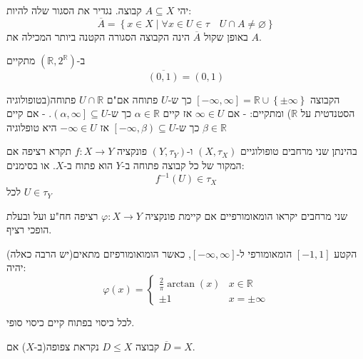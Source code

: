 \documentclass{tstextbook}
\begin{document}
\begin{definition}
יהי \(A\subseteq X\) קבוצה. נגדיר את הסגור שלה להיות:
$$\overline{A} = \left\{   x \in X \mid \forall x \in U \in \tau \quad U \cap A \neq \varnothing  \right\}$$
באופן שקול \(\overline{A}\) הינה הקבוצה הסגורה הקטנה ביותר המכילה את \(A\).

\end{definition}
\begin{example}
ב-\(\left( \mathbb{R}, 2^{\mathbb{R}} \right)\) מתקיים
$$\overline{(0,1)} = (0,1)$$

\end{example}
\begin{example}
הקבוצה \(\left[ -\infty,\infty \right]=\mathbb{R}\cup \left\{  \pm \infty  \right\}\) כך ש-\(U\) פתוחה אם"ם \(U\cap \mathbb{R}\) פתוחה(בטופולוגיה הסטנדטית על \(\mathbb{R}\)) ומתקיים:
- אם \(\infty \in U\) אז קיים \(\alpha \in \mathbb{R}\) כך ש-\(\left( \alpha,\infty \right]\subseteq U\). 
- אם קיים \(\beta \in \mathbb{R}\) כך ש-\(\left[ -\infty,\beta \right)\subseteq U\) אז \(-\infty \in U\)
היא טופלוגיה

\end{example}
\begin{definition}[רציפות]
בהינתן שני מרחבים טופולוגיים \(\left( X,\tau_{X} \right)\) ו-\(\left( Y,\tau_{Y} \right)\) פונקציה \(f:X\to Y\) תקרא רציפה אם המקור של כל קבוצה פתוחה ב-\(Y\) הוא פתוח ב-\(X\). או בסימנים:
$$f^{-1} (U) \in \tau_{X}$$
לכל \(U \in \tau_{Y}\)

\end{definition}
\begin{definition}[הומאומורפיזם]
שני מרחבים יקראו הומאומורפיים אם קיימת פונקציה \(\varphi:X\to Y\) רציפה חח"ע ועל ובעלת הופכי רציף.

\end{definition}
\begin{example}
הקטע \([-1,1]\) הומאומורפי ל-\(\left[ -\infty,\infty \right]\), כאשר הומואומורפיזם מתאים(יש הרבה כאלה) יהיה:
$$\varphi(x)=\begin{cases}\frac{2}{\pi}\arctan(x) & x \in \mathbb{R} \\\pm 1 & x=\pm \infty
\end{cases}$$

\end{example}
\begin{definition}[קומפקטיות]
לכל כיסוי בפתוח קיים כיסוי סופי.

\end{definition}
\begin{definition}
קבוצה \(D\leq X\) נקראת צפופה(ב-\(X\)) אם \(\overline{D}=X\).

\end{definition}
\end{document}
